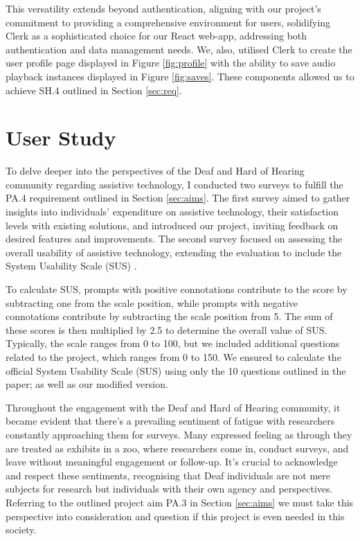 \documentclass{l4proj}
\begin{document}
This versatility extends beyond authentication, aligning with our project's commitment to providing a comprehensive environment for users, solidifying Clerk as a sophisticated choice for our React web-app, addressing both authentication and data management needs. We, also, utilised Clerk to create the user profile page displayed in Figure \ref{fig:profile} with the ability to save audio playback instances displayed in Figure \ref{fig:saves}. These components allowed us to achieve SH.4 outlined in Section \ref{sec:req}.

\chapter{User Study}
\label{sec:user-study}

To delve deeper into the perspectives of the Deaf and Hard of Hearing community regarding assistive technology, I conducted two surveys to fulfill the PA.4 requirement outlined in Section \ref{sec:aims}. The first survey aimed to gather insights into individuals' expenditure on assistive technology, their satisfaction levels with existing solutions, and introduced our project, inviting feedback on desired features and improvements. The second survey focused on assessing the overall usability of assistive technology, extending the evaluation to include the System Usability Scale (SUS) \citep{SUS}. 

To calculate SUS, prompts with positive connotations contribute to the score by subtracting one from the scale position, while prompts with negative connotations contribute by subtracting the scale position from 5. The sum of these scores is then multiplied by 2.5 to determine the overall value of SUS. Typically, the scale ranges from 0 to 100, but we included additional questions related to the project, which ranges from 0 to 150. We ensured to calculate the official System Usability Scale (SUS) using only the 10 questions outlined in the paper; as well as our modified version.

Throughout the engagement with the Deaf and Hard of Hearing community, it became evident that there's a prevailing sentiment of fatigue with researchers constantly approaching them for surveys. Many expressed feeling as through they are treated as exhibits in a zoo, where researchers come in, conduct surveys, and leave without meaningful engagement or follow-up. It's crucial to acknowledge and respect these sentiments, recognising that Deaf individuals are not mere subjects for research but individuals with their own agency and perspectives. Referring to the outlined project aim PA.3 in Section \ref{sec:aims} we must take this perspective into consideration and question if this project is even needed in this society.
\end{document}
